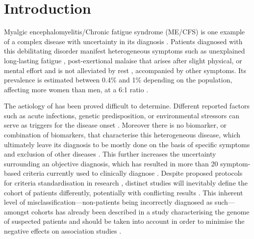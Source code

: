 \section{Introduction}

Myalgic encephalomyelitis/Chronic fatigue syndrome (ME/CFS) is one example of a complex disease with uncertainty in its diagnosis \citep{nacul2017DifferingCase}. Patients diagnosed with this debilitating disorder manifest heterogeneous symptoms such as unexplained long-lasting fatigue \citep{fukuda1994ChronicFatigue}, post-exertional malaise that arises after slight physical, or mental effort and is not alleviated by rest \citep{carruthers2003MyalgicEncephalomyelitis}, accompanied by other symptoms. Its prevalence is estimated between 0.4\% and 1\% depending on the population, affecting more women than men, at a 6:1 ratio \citep{morrisMyalgicEncephalomyelitisChronic2013, lim2020SystematicReviewa}.

The aetiology of \cfs has been proved difficult to determine. Different reported factors such as acute infections, genetic predisposition, or environmental stressors can serve as triggers for the disease onset \citep{lacerdaLogisticRegressionAnalysis2019, chu2019OnsetPatterns}. Moreover there is no biomarker, or combination of biomarkers, that characterise this heterogeneous disease, which ultimately leave its diagnosis to be mostly done on the basis of specific symptoms and exclusion of other diseases \citep{smith2014DiagnosisTreatment}. This further increases the uncertainty surrounding an objective diagnosis, which has resulted in more than 20 symptom-based criteria currently used to clinically diagnose \cfs \citep{brurberg2014CaseDefinitions}. Despite proposed protocols for criteria standardisation in \cfs research \citep{pheby2020DevelopmentConsistent}, distinct studies will inevitably define the cohort of patients differently, potentially with conflicting results \citep{nacul2017DifferingCase}. This inherent level of mis\-clas\-sification---non-\cfs patients being incorrectly diagnosed as such---amongst \cfs cohorts has already been described in a study characterising the genome of suspected patients \citep{brown2021MECFS} and should be taken into account in order to minimise the negative effects on association studies \citep{malato2021Statisticalchallenges}.

